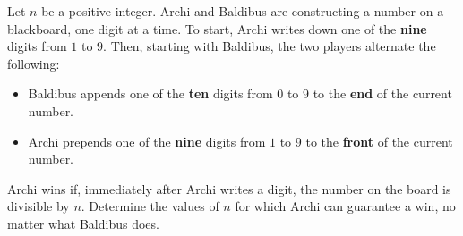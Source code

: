 Let $n$ be a positive integer.
Archi and Baldibus are constructing a number on a blackboard, one digit at a time.
To start, Archi writes down one of the \textbf{nine} digits from $1$ to $9$.
Then, starting with Baldibus, the two players alternate the following:
\begin{itemize}
    \item Baldibus appends one of the \textbf{ten} digits
    from $0$ to $9$ to the \textbf{end} of the current number.
    \item Archi prepends one of the \textbf{nine} digits
    from $1$ to $9$ to the \textbf{front} of the current number.
\end{itemize}
Archi wins if, immediately after Archi writes a digit, the number on the board is divisible by $n$.
Determine the values of $n$ for which Archi can guarantee a win, no matter what Baldibus does.
